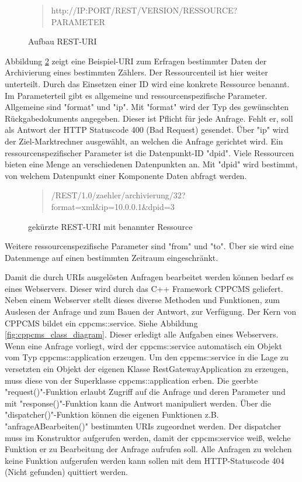 \documentclass{article}
\begin{document}
\begin{figure}[h]
\begin{quote}
http://IP:PORT/REST/VERSION/RESSOURCE?PARAMETER
\end{quote}
\caption{Aufbau REST-URI}
\label{fig:resturi}
\end{figure}

Abbildung \ref{fig:resturi_id} zeigt eine Beispiel-URI zum Erfragen bestimmter Daten der Archivierung eines bestimmten Zählers. Der Ressourcenteil ist hier weiter unterteilt. Durch das Einsetzen einer ID wird eine konkrete Ressource benannt. Im Parameterteil gibt es allgemeine und ressourcenspezifische Parameter. Allgemeine sind "format" und "ip". Mit "format" wird der Typ des gewünschten Rückgabedokuments angegeben. Dieser ist Pflicht für jede Anfrage. Fehlt er, soll als Antwort der HTTP Statuscode 400 (Bad Request) gesendet. Über "ip" wird der Ziel-Marktrechner ausgewählt, an welchen die Anfrage gerichtet wird. Ein ressourcenspezifischer Parameter ist die Datenpunkt-ID "dpid". Viele Ressourcen bieten eine Menge an verschiedenen Datenpunkten an. Mit "dpid" wird bestimmt, von welchem Datenpunkt einer Komponente Daten abfragt werden. 

\begin{figure}[h]
\begin{quote}
/REST/1.0/zaehler/archivierung/32?format=xml\&ip=10.0.0.1\&dpid=3
\end{quote}
\caption{gekürzte REST-URI mit benannter Ressource}
\label{fig:resturi_id}
\end{figure} 

Weitere ressourcenspezifische Parameter sind "from" und "to". Über sie wird eine Datenmenge auf einen bestimmten Zeitraum eingeschränkt.

Damit die durch URIs ausgelösten Anfragen bearbeitet werden können bedarf es eines Webservers. Dieser wird durch das C++ Framework CPPCMS geliefert. Neben einem Webserver stellt dieses diverse Methoden und Funktionen, zum Auslesen der Anfrage und zum Bauen der Antwort, zur Verfügung. Der Kern von CPPCMS bildet ein cppcms::service. Siehe Abbildung \ref{fig:cppcms_class_diagram}. Dieser erledigt alle Aufgaben eines Webservers. Wenn eine Anfrage vorliegt, wird der cppcms::service automatisch ein Objekt vom Typ cppcms::application erzeugen. Um den cppcms::service in die Lage zu versetzten ein Objekt der eigenen Klasse RestGatewayApplication zu erzeugen, muss diese von der Superklasse cppcms::application erben. Die geerbte "request()"-Funktion erlaubt Zugriff auf die Anfrage und deren Parameter und mit "response()"-Funktion kann die Antwort manipuliert werden. Über die "dispatcher()"-Funktion können die eigenen Funktionen z.B. "anfrageABearbeiten()" bestimmten URIs zugeordnet werden. Der dispatcher muss im Konstruktor aufgerufen werden, damit der cppcms:service weiß, welche Funktion er zu Bearbeitung der Anfrage aufrufen soll. Alle Anfragen zu welchen keine Funktion aufgerufen werden kann sollen mit dem HTTP-Statuscode 404 (Nicht gefunden) quittiert werden.
\end{document}

